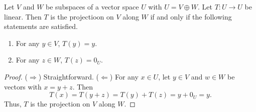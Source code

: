 \begin{theorem}
  Let $V$ and $W$ be subspaces of a vector space $U$ with $U = V \oplus W$.
  Let $T: U \to U$ be linear.
  Then $T$ is the projectioon on $V$ along $W$ if and only if the following
  statements are satisfied.
  \begin{enumerate}
    \item For any $y \in V$, $T(y) = y$.
    \item For any $z \in W$, $T(z) = 0_U$.
  \end{enumerate}
\end{theorem}
\begin{proof}
  ($\Rightarrow$) Straightforward.
  ($\Leftarrow$)
  For any $x \in U$, let $y \in V$ and $w \in W$ be vectors with $x = y + z$.
  Then
  \begin{equation*}
    T(x)
    = T(y + z)
    = T(y) + T(z)
    = y + 0_U
    = y.
  \end{equation*}
  Thus, $T$ is the projection on $V$ along $W$.
\end{proof}